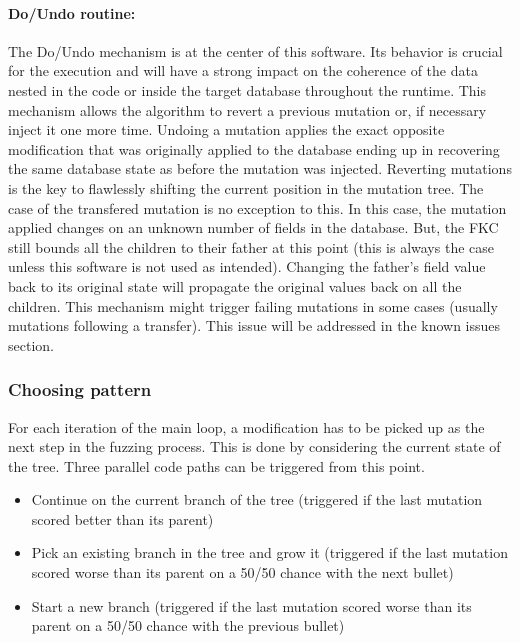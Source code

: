 \documentclass{article}
\begin{document}
\begin{empfile}
				\paragraph{Do/Undo routine:}
The Do/Undo mechanism is at the center of this software. Its behavior is crucial for the execution and will have a strong impact on the coherence of the data nested in the code or inside the target database throughout the runtime.
This mechanism allows the algorithm to revert a previous mutation or, if necessary inject it one more time. 
Undoing a mutation applies the exact opposite modification that was originally applied to the database ending up in recovering the same database state as before the mutation was injected.
Reverting mutations is the key to flawlessly shifting the current position in the mutation tree.
The case of the transfered mutation is no exception to this. In this case, the mutation applied changes on an unknown number of fields in the database. But, the FKC still bounds all the children to their father at this point (this is always the case unless this software is not used as intended).  
Changing the father's field value back to its original state will propagate the original values back on all the children.
This mechanism might trigger failing mutations in some cases (usually mutations following a transfer). This issue will be addressed in the known issues section. 

				\subsubsection{Choosing pattern}
For each iteration of the main loop, a modification has to be picked up as the next step in the fuzzing process. This is done by considering the current state of the tree. Three parallel code paths can be triggered from this point.
				\begin{itemize}
				\item{Continue on the current branch of the tree (triggered if the last mutation scored better than its parent)}
				\item{Pick an existing branch in the tree and grow it (triggered if the last mutation scored worse than its parent on a 50/50 chance with the next bullet)}
				\item{Start a new branch (triggered if the last mutation scored worse than its parent on a 50/50 chance with the previous bullet)}
				\end{itemize}				
				

\end{empfile}
\end{document}
